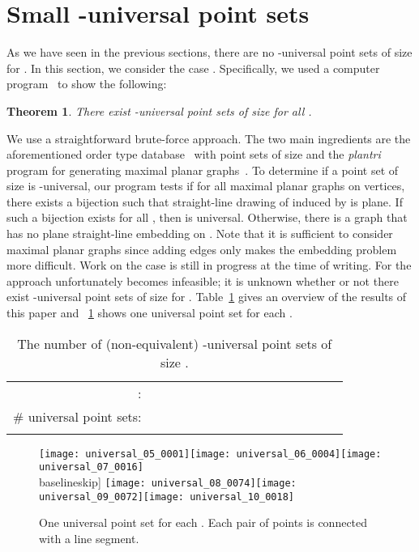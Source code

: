 \documentclass[11pt]{article}
\newtheorem{theorem}[equation]{Theorem}
\begin{document}
\section{Small -universal point sets}
\label{sec:small}

As we have seen in the previous sections, there are no -universal point sets
of size  for . In this section, we consider the case .
Specifically, we used a computer program~\cite{universalsrc} to show the
following:
\begin{theorem}
  \label{thm:at_most_10}
  There exist -universal point sets of size  for all .
\end{theorem}
We use a straightforward brute-force approach. The two main ingredients are the
aforementioned order type database~\cite{ak-psotd-01} with point sets of size
 and the \emph{plantri} program for generating maximal planar
graphs~\cite{brinkmann2007fast,plantrisrc}. To determine if a point set  of
size  is -universal, our program tests if for all maximal planar graphs
 on  vertices, there exists a bijection  such
that straight-line drawing of  induced by  is plane. If such a
bijection exists for all , then  is universal. Otherwise, there is a graph
 that has no plane straight-line embedding on . Note that it is sufficient
to consider maximal planar graphs since adding edges only makes the embedding
problem more difficult. Work on the case  is still in progress at the time
of writing. For  the approach unfortunately becomes infeasible; it is
unknown whether or not there exist -universal point sets of size  for
. Table~\ref{tab:ups_numbers} gives an overview of the results
of this paper and \figurename~\ref{fig:universal_5_10} shows one universal point
set for each .

\begin{table}
  \centering
  \setlength{\tabcolsep}{2.5pt}
  \begin{tabular}{@{}r*{15}{c}@{}}
    \toprule : &  &  &  &  &  &  &  &  &  &  &  &  &
     &  & \\
    \# universal point sets: &  &  &  &  &  &  &  &  &  &  &  &
     &  &  & \\
    \bottomrule\\
  \end{tabular}
  \caption{The number of (non-equivalent) -universal point sets of size .}
  \label{tab:ups_numbers}
\end{table}

\begin{figure}[htbp]
  \centering \newcommand{\thisfigwidth}{0.3\textwidth}\texttt{[image: universal\_05\_0001]}\hfil \texttt{[image: universal\_06\_0004]}\hfil \texttt{[image: universal\_07\_0016]}\\baselineskip]
  \texttt{[image: universal\_08\_0074]}\hfil \texttt{[image: universal\_09\_0072]}\hfil \texttt{[image: universal\_10\_0018]}
  \caption{One universal point set for each . Each pair of points
    is connected with a line segment.}
  \label{fig:universal_5_10}
\end{figure}

\newpage

\end{document}

